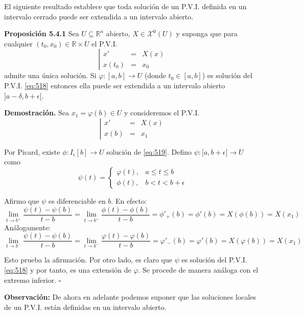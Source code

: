 \documentclass[11pt,a4paper]{article}
\theoremstyle{definition}
\theoremstyle{plain}
\theoremstyle{remark}
\begin{document}
	El siguiente resultado establece que toda solución de un P.V.I. definida en un intervalo cerrado puede ser extendida a un intervalo abierto.
	
	\noindent \textbf{Proposición 5.4.1} Sea $U \subseteq \mathbb{R}^n$ abierto, $X \in \mathcal{X}^0(U)$ y suponga que para cualquier $(t_0, x_0) \in \mathbb{R} \times U$ el P.V.I.
	\begin{equation}\label{eq:518}
		\left| 
		\begin{array}{lcl}
			x' &=& X(x) \\
			x(t_0) &=& x_0
		\end{array}
		\right.
	\end{equation}
	admite una única solución. Si $\varphi : [a,b] \to U$ (donde $t_0 \in [a,b]$) es solución del P.V.I. \eqref{eq:518} entonces ella puede ser extendida a un intervalo abierto $]a - \delta, b + \epsilon[$.
	
	\noindent \textbf{Demostración.} Sea $x_1 = \varphi(b) \in U$ y consideremos el P.V.I.
	\begin{equation}\label{eq:519}
		\left| 
		\begin{array}{lcl}
			x' &=& X(x) \\
			x(b) &=& x_1
		\end{array}
		\right.
	\end{equation}
	
	Por Picard, existe $\phi : I_\epsilon[b] \to U$ solución de \eqref{eq:519}. Defino $\psi : [a, b + \epsilon[ \to U$ como
	\[
	\psi(t) = \begin{cases} 
		\varphi(t), & a \le t \le b \\ 
		\phi(t), & b < t < b + \epsilon 
	\end{cases}
	\]
	
	Afirmo que $\psi$ es diferenciable en $b$. En efecto:
	\[
	\lim_{t \to b^+} \frac{\psi(t) - \psi(b)}{t - b} = \lim_{t \to b^+} \frac{\phi(t) - \phi(b)}{t - b} = \phi'_+(b) = \phi'(b) = X(\phi(b)) = X(x_1)
	\]
	Análogamente:
	\[
	\lim_{t \to b^-} \frac{\psi(t) - \psi(b)}{t - b} = \lim_{t \to b^-} \frac{\varphi(t) - \varphi(b)}{t - b} = \varphi'_-(b) = \varphi'(b) = X(\varphi(b)) = X(x_1)
	\]
	
	Esto prueba la afirmación. Por otro lado, es claro que $\psi$ es solución del P.V.I. \eqref{eq:518} y por tanto, es una extensión de $\varphi$. Se procede de manera análoga con el extremo inferior. \hfill $\square$
	
	\noindent \textbf{Observación:} De ahora en adelante podemos suponer que las soluciones locales de un P.V.I. están definidas en un intervalo abierto.
	
\end{document}
